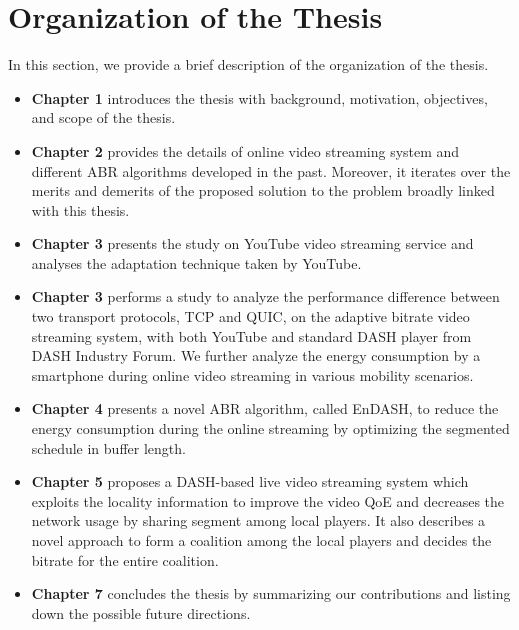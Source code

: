 \section{Organization of the Thesis}

In this section, we provide a brief description of the organization of the thesis.
\begin{itemize}
	\item {\bf Chapter 1} introduces the thesis with background, motivation, objectives, and scope of the thesis.
	\item {\bf Chapter 2} provides the details of online video streaming system and different ABR algorithms developed in the past. Moreover, it iterates over the merits and demerits of the proposed solution to the problem broadly linked with this thesis.
	\item {\bf Chapter 3} presents the study on YouTube video streaming service and analyses the adaptation technique taken by YouTube.
	\item {\bf Chapter 3} performs a study to analyze the performance difference between two transport protocols, TCP and QUIC, on the adaptive bitrate video streaming system, with both YouTube and standard DASH player from DASH Industry Forum. We further analyze the energy consumption by a smartphone during online video streaming in various mobility scenarios.
	\item {\bf Chapter 4} presents a novel ABR algorithm, called EnDASH, to reduce the energy consumption during the online streaming by optimizing the segmented schedule in buffer length.
	\item {\bf Chapter 5} proposes a DASH-based live video streaming system which exploits the locality information to improve the video QoE and decreases the network usage by sharing segment among local players. It also describes a novel approach to form a coalition among the local players and decides the bitrate for the entire coalition.
	\item {\bf Chapter 7} concludes the thesis by summarizing our contributions and listing down the possible future directions.
\end{itemize}